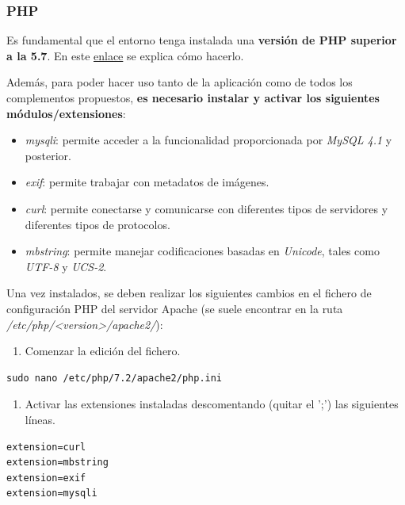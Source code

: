 \documentclass[
]{article}
\providecommand{\tightlist}{%
  \setlength{\itemsep}{0pt}\setlength{\parskip}{0pt}}
\begin{document}
\hypertarget{php}{%
\subsubsection{PHP}\label{php}}

Es fundamental que el entorno tenga instalada una \textbf{versión de PHP
superior a la 5.7}. En este
\href{https://www.php.net/manual/es/install.php}{enlace} se explica cómo
hacerlo.

Además, para poder hacer uso tanto de la aplicación como de todos los
complementos propuestos, \textbf{es necesario instalar y activar los
siguientes módulos/extensiones}:

\begin{itemize}
\tightlist
\item
  \emph{mysqli}: permite acceder a la funcionalidad proporcionada por
  \emph{MySQL 4.1} y posterior.
\item
  \emph{exif}: permite trabajar con metadatos de imágenes.
\item
  \emph{curl}: permite conectarse y comunicarse con diferentes tipos de
  servidores y diferentes tipos de protocolos.
\item
  \emph{mbstring}: permite manejar codificaciones basadas en
  \emph{Unicode}, tales como \emph{UTF-8} y \emph{UCS-2}.
\end{itemize}

Una vez instalados, se deben realizar los siguientes cambios en el
fichero de configuración PHP del servidor Apache (se suele encontrar en
la ruta \emph{/etc/php/\textless version\textgreater/apache2/}):

\begin{enumerate}
\def\labelenumi{\arabic{enumi}.}
\tightlist
\item
  Comenzar la edición del fichero.
\end{enumerate}

\begin{verbatim}
sudo nano /etc/php/7.2/apache2/php.ini
\end{verbatim}

\begin{enumerate}
\def\labelenumi{\arabic{enumi}.}
\setcounter{enumi}{1}
\tightlist
\item
  Activar las extensiones instaladas descomentando (quitar el ';') las
  siguientes líneas.
\end{enumerate}

\begin{verbatim}
extension=curl
extension=mbstring
extension=exif
extension=mysqli
\end{verbatim}
\end{document}
